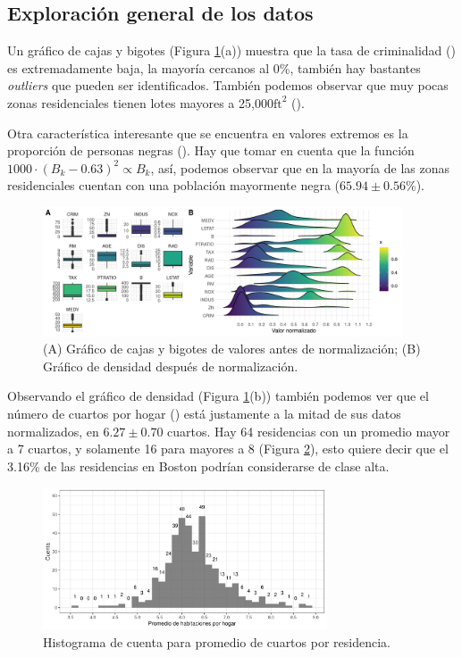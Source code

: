 \documentclass[11pt, letterpaper]{article}
\begin{document}
\subsection{Exploración general de los datos}
Un gráfico de cajas y bigotes (Figura \ref{fig:descriptive}(a)) muestra que la tasa de criminalidad () es extremadamente baja, la mayoría cercanos al 0\%, también hay bastantes \textit{outliers} que pueden ser identificados. También podemos observar que muy pocas zonas residenciales tienen lotes mayores a 25,000$\mathrm{ft}^2$ ().

Otra característica interesante que se encuentra en valores extremos es la proporción de personas negras (). Hay que tomar en cuenta que la función $1000\cdot (B_k - 0.63)^2 \propto B_k$, así, podemos observar que en la mayoría de las zonas residenciales cuentan con una población mayormente negra ($65.94\pm 0.56$\%). 

\begin{figure}[htb!]
	\centering
	\includegraphics[width=0.95\textwidth]{figuras/boxplot-density.png}
	\caption{(A) Gráfico de cajas y bigotes de valores antes de normalización; (B) Gráfico de densidad después de normalización.}
	\label{fig:descriptive}
\end{figure}

Observando el gráfico de densidad (Figura \ref{fig:descriptive}(b)) también podemos ver que el número de cuartos por hogar () está justamente a la mitad de sus datos normalizados, en $6.27\pm 0.70$ cuartos. Hay 64 residencias con un promedio mayor a 7 cuartos, y solamente 16 para mayores a 8 (Figura \ref{fig:histogram}), esto quiere decir que el 3.16\% de las residencias en Boston podrían considerarse de clase alta.

\begin{figure}[htb!]
	\centering
	\includegraphics[width=0.75\textwidth]{figuras/RM-histogram.png}
	\caption{Histograma de cuenta para promedio de cuartos por residencia.}
	\label{fig:histogram}
\end{figure}
\end{document}
